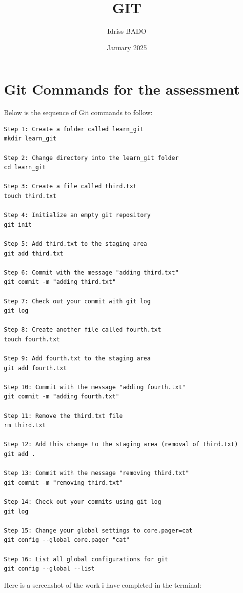 \documentclass{article}
\title{GIT}
\author{Idriss BADO}
\date{January 2025}
\begin{document}
\maketitle

\section*{Git Commands for the assessment}



Below is the sequence of Git commands to follow:

\begin{verbatim}
Step 1: Create a folder called learn_git
mkdir learn_git

Step 2: Change directory into the learn_git folder
cd learn_git

Step 3: Create a file called third.txt
touch third.txt

Step 4: Initialize an empty git repository
git init

Step 5: Add third.txt to the staging area
git add third.txt

Step 6: Commit with the message "adding third.txt"
git commit -m "adding third.txt"

Step 7: Check out your commit with git log
git log

Step 8: Create another file called fourth.txt
touch fourth.txt

Step 9: Add fourth.txt to the staging area
git add fourth.txt

Step 10: Commit with the message "adding fourth.txt"
git commit -m "adding fourth.txt"

Step 11: Remove the third.txt file
rm third.txt

Step 12: Add this change to the staging area (removal of third.txt)
git add .

Step 13: Commit with the message "removing third.txt"
git commit -m "removing third.txt"

Step 14: Check out your commits using git log
git log

Step 15: Change your global settings to core.pager=cat
git config --global core.pager "cat"

Step 16: List all global configurations for git
git config --global --list
\end{verbatim}
Here is a screenshot of the work i have completed in the terminal:
\end{document}
